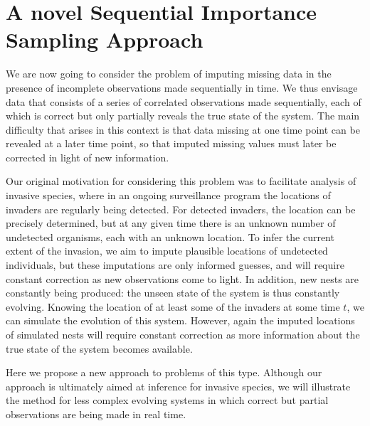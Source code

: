 \chapter[A novel Sequential Importance Sampling Approach]{A novel Sequential Importance Sampling Approach}
\label{ch:SIS}


We are now going to consider the problem of imputing missing data in the presence of incomplete observations made sequentially in time. We thus envisage data that consists of a series of correlated observations made sequentially, each of which is correct but only partially reveals the true state of the system. The main difficulty that arises in this context is that data missing at one time point can be revealed at a later time point, so that imputed missing values must later be corrected in light of new information.

Our original motivation for considering this problem was to facilitate analysis of invasive species, where in an ongoing surveillance program the locations of invaders are regularly being detected. For detected invaders, the location can be precisely determined, but at any given time there is an unknown number of undetected organisms, each with an unknown location. To infer the current extent of the invasion, we aim to impute plausible locations of undetected individuals, but these imputations are only informed guesses, and will require constant correction as new observations come to light. In addition, new nests are constantly being produced: the unseen state of the system is thus constantly evolving. Knowing the location of at least some of the invaders at some time $t$, we can simulate the evolution of this system. However, again the imputed locations of simulated nests will require constant correction as more information about the true state of the system becomes available.

Here we propose a new approach to problems of this type. Although our approach is ultimately aimed at inference for invasive species, we will illustrate the method for less complex evolving systems in which correct but partial observations are being made in real time.

